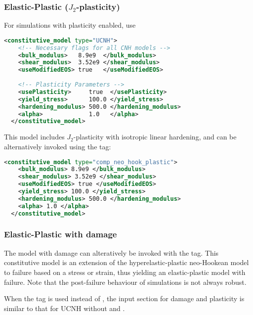\subsubsection{Elastic-Plastic ($J_2$-plasticity)}
For simulations with plasticity enabled, use
\begin{lstlisting}[language=XML]
  <constitutive_model type="UCNH"> 
    <!-- Necessary flags for all CNH models -->
    <bulk_modulus>   8.9e9  </bulk_modulus>
    <shear_modulus>  3.52e9 </shear_modulus>
    <useModifiedEOS> true   </useModifiedEOS>
                
    <!-- Plasticity Parameters -->
    <usePlasticity>     true  </usePlasticity>
    <yield_stress>      100.0 </yield_stress>
    <hardening_modulus> 500.0 </hardening_modulus>
    <alpha>             1.0   </alpha>
  </constitutive_model>
\end{lstlisting}
This model includes $J_2$-plasticity with isotropic linear hardening, 
and can be alternatively invoked using the  tag:
\begin{lstlisting}[language=XML]
  <constitutive_model type="comp_neo_hook_plastic">
    <bulk_modulus> 8.9e9 </bulk_modulus>
    <shear_modulus> 3.52e9 </shear_modulus>
    <useModifiedEOS> true </useModifiedEOS>
    <yield_stress> 100.0 </yield_stress>
    <hardening_modulus> 500.0 </hardening_modulus>
    <alpha> 1.0 </alpha>
  </constitutive_model>
\end{lstlisting}

\subsubsection{Elastic-Plastic with damage}
The  model with damage can alteratively be invoked with the 
tag. This constitutive model is an extension of the hyperelastic-plastic neo-Hookean model
to failure based on a stress or strain, thus yielding an elastic-plastic model with failure.  
Note that the post-failure behaviour of simulations is not always robust.  

When the  tag is used instead of , the input section for 
damage and plasticity is similar to that for UCNH without  and 
.

